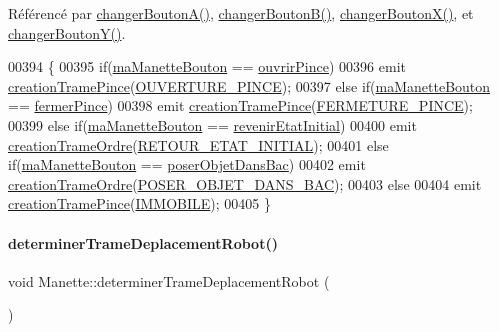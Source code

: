 Référencé par \hyperlink{manette_8cpp_source_l00551}{changer\+Bouton\+A()}, \hyperlink{manette_8cpp_source_l00558}{changer\+Bouton\+B()}, \hyperlink{manette_8cpp_source_l00565}{changer\+Bouton\+X()}, et \hyperlink{manette_8cpp_source_l00572}{changer\+Bouton\+Y()}.


\begin{DoxyCode}
00394 \{
00395     \textcolor{keywordflow}{if}(\hyperlink{class_manette_ae69fd9baa0dad8a960fa93611b6a185f}{maManetteBouton} == \hyperlink{class_manette_a066eacf19e615fd72690477c043e3703}{ouvrirPince})
00396         emit \hyperlink{class_manette_a16cb602cf7001f78b115f395fad47586}{creationTramePince}(\hyperlink{manette_8h_a0259cc955736c3970883196448e0476a}{OUVERTURE\_PINCE});
00397     \textcolor{keywordflow}{else} \textcolor{keywordflow}{if}(\hyperlink{class_manette_ae69fd9baa0dad8a960fa93611b6a185f}{maManetteBouton} == \hyperlink{class_manette_a32adcccdddf35a04970b8b3b12462c00}{fermerPince})
00398         emit \hyperlink{class_manette_a16cb602cf7001f78b115f395fad47586}{creationTramePince}(\hyperlink{manette_8h_a1c242b29a47122b6c528f2bcb73a29e2}{FERMETURE\_PINCE});
00399     \textcolor{keywordflow}{else} \textcolor{keywordflow}{if}(\hyperlink{class_manette_ae69fd9baa0dad8a960fa93611b6a185f}{maManetteBouton} == \hyperlink{class_manette_a4c0e9611f08e363feb0a24f8c9d258f2}{revenirEtatInitial})
00400         emit \hyperlink{class_manette_ad28d8f539df6b73805ae94e9bbd827ec}{creationTrameOrdre}(\hyperlink{manette_8h_a0d14fc3b862ee6b41366ac22e9737025}{RETOUR\_ETAT\_INITIAL});
00401     \textcolor{keywordflow}{else} \textcolor{keywordflow}{if}(\hyperlink{class_manette_ae69fd9baa0dad8a960fa93611b6a185f}{maManetteBouton} == \hyperlink{class_manette_a93fc38a8ca8fbb1cc57cedbab059c56f}{poserObjetDansBac})
00402         emit \hyperlink{class_manette_ad28d8f539df6b73805ae94e9bbd827ec}{creationTrameOrdre}(\hyperlink{manette_8h_afeb63c058f63189b11f10b79f90459e2}{POSER\_OBJET\_DANS\_BAC});
00403     \textcolor{keywordflow}{else}
00404         emit \hyperlink{class_manette_a16cb602cf7001f78b115f395fad47586}{creationTramePince}(\hyperlink{manette_8h_a16ccf2890fcfc78a47402fe94becb6ca}{IMMOBILE});
00405 \}
\end{DoxyCode}
\mbox{\label{class_manette_a97a50caac68954a229c7e9461e7f4232}} 
\paragraph{\texorpdfstring{determiner\+Trame\+Deplacement\+Robot()}{determinerTrameDeplacementRobot()}}
{\footnotesize\ttfamily void Manette\+::determiner\+Trame\+Deplacement\+Robot (\begin{DoxyParamCaption}{ }\end{DoxyParamCaption})}



